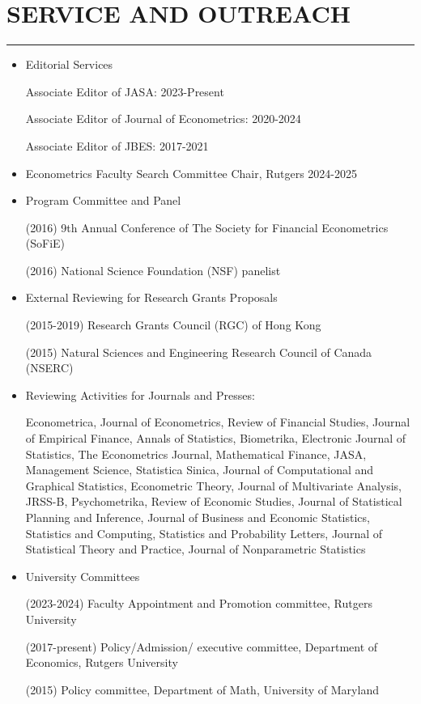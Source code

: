 \documentclass[11pt]{article}
\begin{document}
  \section*{  SERVICE AND OUTREACH}
\hrule
\hfill
\begin{itemize}

\item Editorial Services 

Associate Editor of JASA:  2023-Present 


Associate Editor of Journal of Econometrics:  2020-2024




Associate Editor of JBES:  2017-2021

\item Econometrics Faculty Search Committee Chair, Rutgers 2024-2025

\item Program Committee and Panel

(2016)   9th Annual Conference of The Society for Financial Econometrics (SoFiE)

(2016) National Science Foundation (NSF)  panelist

\item External Reviewing for Research Grants Proposals

(2015-2019)  Research Grants Council (RGC) of Hong Kong

(2015)  Natural Sciences and Engineering Research Council of Canada  (NSERC)


\item Reviewing Activities for Journals and Presses:



  Econometrica, Journal of Econometrics, Review of Financial Studies, Journal of Empirical Finance, Annals of Statistics, Biometrika,  Electronic Journal of Statistics, The Econometrics Journal, Mathematical Finance, JASA, Management Science, Statistica Sinica,   Journal of Computational and Graphical Statistics, Econometric Theory, Journal of Multivariate Analysis, JRSS-B, Psychometrika, Review of Economic Studies, Journal of Statistical Planning and Inference, Journal of Business and Economic Statistics, Statistics and Computing, Statistics and Probability Letters, Journal of Statistical Theory and Practice, Journal of Nonparametric Statistics

\item University Committees

 (2023-2024) Faculty Appointment and Promotion committee, Rutgers University

 
 (2017-present) Policy/Admission/ executive committee, Department of Economics, Rutgers University

 (2015) Policy committee, Department of Math, University of Maryland




\end{itemize}
\end{document}
